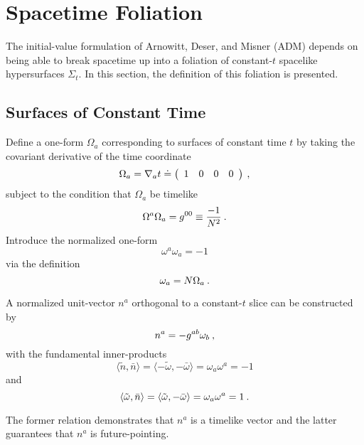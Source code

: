 \section{Spacetime Foliation}\label{S:3p1split}

The initial-value formulation of Arnowitt, Deser, and Misner (ADM) depends on
being able to break spacetime up into a foliation of constant-$t$ spacelike
hypersurfaces $\Sigma_t$.  In this section, the definition of this foliation
is presented.


\subsection{Surfaces of Constant Time}\label{SS:const_t}

Define a one-form $\Omega_a$ corresponding to surfaces of constant time $t$ by
taking the covariant derivative of the time coordinate
\begin{equation}\label{eq:cov_time}
   \Omega_{a} = \nabla_{a} t
              \doteq \left( \begin{array}{cccc} 1&0&0&0 \end{array} \right) \: ,
\end{equation}
subject to the condition that $\Omega_a$ be timelike
\[
   \Omega^{a} \Omega_{a} = g^{00} \equiv \frac{-1}{N^2} \: .
\]
Introduce the normalized one-form
\begin{equation}\label{eq:norm_form}
   \omega^{a} \omega_{a} = -1
\end{equation}
via the definition
\[
   \omega_{a} = N \Omega_{a} \: .
\]

A normalized unit-vector ${n^a}$ orthogonal to a constant-$t$ slice can be
constructed by
\begin{equation}\label{eq:unit_norm}
   n^{a} = - g^{a b} \omega_{b} \: ,
\end{equation}
with the fundamental inner-products
\[
   \langle \tilde n , \bar n \rangle =
   \langle -\tilde \omega , -\bar \omega \rangle =
   \omega_{a} \omega^{a} = -1
\]
and
\[
   \langle \tilde \omega ,  \bar n \rangle =
   \langle \tilde \omega , -\bar \omega \rangle =
   \omega_{a} \omega^{a} = 1 \: .
\]

The former relation demonstrates that $n^a$ is a timelike vector and the
latter guarantees that $n^a$ is future-pointing.

